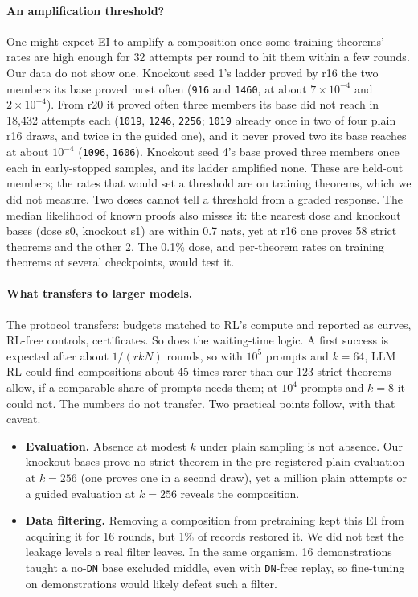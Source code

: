 \paragraph{An amplification threshold?} One might expect EI to amplify a composition once some training theorems' rates
are high enough for 32 attempts per round to hit them within a few rounds. Our data do not show one. Knockout seed 1's
ladder proved by r16 the two members its base proved most often (\texttt{916} and \texttt{1460}, at about
$7\times10^{-4}$ and $2\times10^{-4}$). From r20 it proved often three members its base did not reach in 18,432
attempts each (\texttt{1019}, \texttt{1246}, \texttt{2256}; \texttt{1019} already once in two of four plain r16 draws, and twice in the guided one), and it never proved two its base reaches at about $10^{-4}$
(\texttt{1096}, \texttt{1606}). Knockout seed 4's base proved three members once each in early-stopped samples, and its
ladder amplified none. These are held-out members; the rates that would set a threshold are on training theorems, which
we did not measure. Two doses cannot tell a threshold from a graded response. The median likelihood of known proofs also
misses it: the nearest dose and knockout bases (dose s0, knockout s1) are within 0.7 nats, yet at r16 one proves 58
strict theorems and the other 2. The 0.1\% dose, and per-theorem rates on training
theorems at several checkpoints, would test it.

\paragraph{What transfers to larger models.} The protocol transfers: budgets matched to RL's compute and reported as
curves, RL-free controls, certificates. So does the waiting-time logic. A first success is expected after about
$1/(rkN)$ rounds, so with $10^5$ prompts and $k = 64$, LLM RL could find compositions about 45 times rarer than our 123
strict theorems allow, if a comparable share of prompts needs them; at $10^4$ prompts and $k = 8$ it could not. The numbers do not transfer. Two practical points
follow, with that caveat.
\begin{itemize}
\item \textbf{Evaluation.} Absence at modest $k$ under plain sampling is not absence. Our knockout bases prove no strict theorem in the
pre-registered plain evaluation at $k=256$ (one proves one in a second draw), yet a million plain attempts or a guided evaluation at $k=256$ reveals the composition.
\item \textbf{Data filtering.} Removing a composition from pretraining kept this EI from acquiring it for 16 rounds, but
1\% of records restored it. We did not test the leakage levels a real filter leaves. In the same organism, 16
demonstrations taught a no-\texttt{DN} base excluded middle, even with \texttt{DN}-free replay, so fine-tuning on demonstrations would likely defeat such a
filter.
\end{itemize}


